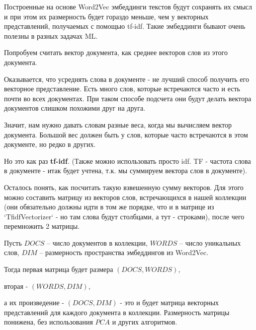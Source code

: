 Построенные на основе Word2Vec эмбеддинги текстов будут сохранять их смысл и при этом их размерность будет гораздо меньше, чем у векторных представлений, получаемых с помощью tf-idf. Такие эмбеддинги бывают очень полезны в разных задачах ML.

Попробуем считать вектор документа, как среднее векторов слов из этого документа. 

Оказывается, что усреднять слова в документе - не лучший способ получить его векторное представление. Есть много слов, которые встречаются часто и есть почти во всех документах. При таком способе подсчета они будут делать вектора документов слишком похожими друг на друга.

Значит, нам нужно давать словам разные веса, когда мы вычисляем вектор документа. Большой вес должен быть у слов, которые часто встречаются в этом документе, но редко в других.

Но это как раз \textbf{tf-idf}. (Также можно использовать просто idf. TF - частота слова в документе - итак будет учтена, т.к. мы суммируем вектора слов в документе).

Осталось понять, как посчитать такую взвешенную сумму векторов. Для этого можно составить матрицу из векторов слов, встречающихся в нашей коллекции (они обязательно должны идти в том же порядке, что и в матрице из `TfidfVectorizer` - но там слова будут столбцами, а тут - строками), после чего перемножить 2 матрицы.

Пусть $DOCS$ -- число документов в коллекции, $WORDS$ -- число уникальных слов, $DIM$ -- размерность пространства эмбеддингов из Word2Vec.

Тогда первая матрица будет размера $(DOCS, WORDS)$, 

вторая - $(WORDS, DIM)$, 

а их произведение - $(DOCS, DIM)$ - это и будет матрица векторных представлений для каждого документа в коллекции. Размерность матрицы понижена, без использования $PCA$ и других алгоритмов.
